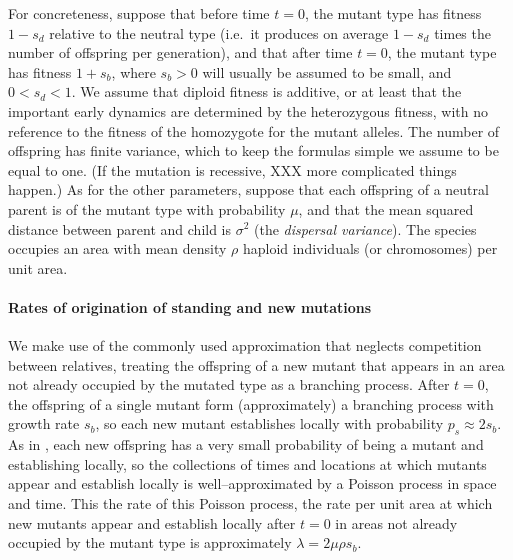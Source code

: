 \documentclass{article}
\begin{document}
For concreteness, suppose that before time $t=0$,
the mutant type has fitness $1-s_d$ relative to the neutral type
(i.e.\ it produces on average $1-s_d$ times the number of offspring per generation),
and that after time $t=0$,
the mutant type has fitness $1+s_b$,
where $s_b>0$ will usually be assumed to be small, and $0<s_d<1$.
We assume that diploid fitness is additive, or at least that the
important early dynamics are determined by the heterozygous fitness, with no reference to the fitness of the
  homozygote for the mutant alleles.
The number of offspring has finite variance, which to keep the formulas simple we assume to be equal to one.
(If the mutation is recessive, XXX more complicated things happen.)
As for the other parameters,
suppose that each offspring of a neutral parent is of the mutant type with probability $\mu$,
and that the mean squared distance between parent and child is $\sigma^2$ (the {\em dispersal variance}).
The species occupies an area with mean density
$\rho$ haploid individuals (or chromosomes) per unit area.



\paragraph{Rates of origination of standing and new mutations}
We make use of the commonly used approximation that neglects competition between relatives,
treating the offspring of a new mutant that appears in an area not already occupied by the mutated type
as a branching process.
After $t=0$, the offspring of a single mutant form (approximately) a branching process with growth rate $s_b$,
so each new mutant establishes locally with probability $p_s \approx 2s_b$.
As in \cite{ralphcoop2010}, each new offspring has a very small probability of being a mutant and establishing locally,
so the collections of times and locations at which mutants appear and establish locally 
is well--approximated by a Poisson process in space and time.
This the rate of this Poisson process, 
the rate per unit area at which new mutants appear and establish locally after $t=0$ in areas not already occupied by the mutant type
is approximately $\lambda = 2 \mu \rho s_b$.
\end{document}
